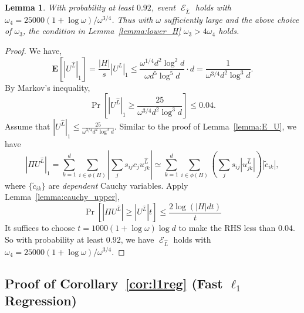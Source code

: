 \documentclass[11pt]{article}
\newtheorem{lemma}{Lemma}
\DeclareMathOperator{\E}{\mathcal{E}}
\begin{document}
\begin{lemma}
  With probability at least $0.92$, event $\E_{\hat{L}}$ holds with
  $\omega_4 = 25000(1+\log \omega)/\omega^{3/4}$.
  Thus with $\omega$ sufficiently large and the above choice of $\omega_3$, the
  condition in Lemma~\ref{lemma:lower_H} $\omega_3 > 4 \omega_4$ holds.
\end{lemma}
\begin{proof}
  We have,
  \begin{equation*}
    \mathbf{E}[|U^{\hat{L}}|_1] = \frac{|H|}{s} |U^{L}|_1 
    \leq \frac{\omega^{1/4} d^2 \log^2 d}{\omega d^5 \log^5 d} \cdot d 
    = \frac{1}{\omega^{3/4} d^2 \log^3 d}.
  \end{equation*}
  By Markov's inequality,
  \begin{equation*}
    \Pr\left[|U^{\hat{L}}|_1 \geq \frac{25}{\omega^{3/4} d^2 \log^3 d}\right] \leq 0.04.
  \end{equation*}
  Assume that $|U^{\hat{L}}|_1 \leq \frac{25}{\omega^{3/4} d^2 \log^3 d}$.
  Similar to the proof of Lemma~\ref{lemma:E_U}, we have
  \begin{equation*}
    |\Pi U^{\hat{L}}|_1 = \sum_{k=1}^d  \sum_{i \in \phi(H)} | \sum_j s_{ij} c_j u^{\hat{L}}_{jk} | 
    \simeq \sum_{k=1}^d \sum_{i \in \phi(H)} \left( \sum_{j} s_{ij} |u^{\hat{L}}_{jk}| \right) |\tilde{c}_{ik}|,
  \end{equation*}
  where $\{\tilde{c}_{ik}\}$ are \emph{dependent} Cauchy variables.
  Apply Lemma~\ref{lemma:cauchy_upper},
  \begin{equation*}
    \Pr[ |\Pi U^{\hat{L}}| \geq |U^{\hat{L}}| t ] \leq \frac{2 \log(|H| d t)}{t}
  \end{equation*}
  It suffices to choose $t = 1000 (1 + \log \omega) \log d$ to make the RHS less
  than $0.04$.
  So with probability at least $0.92$, we have $\E_{\hat{L}}$ holds with
  $\omega_4 = 25000(1+\log \omega)/\omega^{3/4}$.
\end{proof}


\subsection{Proof of Corollary~\ref{cor:l1reg} (Fast $\ell_1$ Regression)}
\label{sxn:pf-cor-l1reg}
\end{document}
